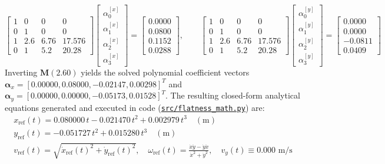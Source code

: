 \documentclass[10pt,a4paper]{article}
\begin{document}
\begin{equation}
    \begin{bmatrix}
        1 & 0 & 0 & 0 \\
        0 & 1 & 0 & 0 \\
        1 & 2.6 & 6.76 & 17.576 \\
        0 & 1 & 5.2 & 20.28
    \end{bmatrix}
    \begin{bmatrix}
        \alpha_0^{[x]} \\ \alpha_1^{[x]} \\ \alpha_2^{[x]} \\ \alpha_3^{[x]}
    \end{bmatrix}
    =
    \begin{bmatrix}
        0.0000 \\ 0.0800 \\ 0.1152 \\ 0.0288
    \end{bmatrix}, \qquad
    \begin{bmatrix}
        1 & 0 & 0 & 0 \\
        0 & 1 & 0 & 0 \\
        1 & 2.6 & 6.76 & 17.576 \\
        0 & 1 & 5.2 & 20.28
    \end{bmatrix}
    \begin{bmatrix}
        \alpha_0^{[y]} \\ \alpha_1^{[y]} \\ \alpha_2^{[y]} \\ \alpha_3^{[y]}
    \end{bmatrix}
    =
    \begin{bmatrix}
        0.0000 \\ 0.0000 \\ -0.0811 \\ 0.0409
    \end{bmatrix}
\end{equation}
Inverting $\mathbf{M}(2.60)$ yields the solved polynomial coefficient vectors $\boldsymbol{\alpha}_x = [0.00000, 0.08000, -0.02147, 0.00298]^T$ and $\boldsymbol{\alpha}_y = [0.00000, 0.00000, -0.05173, 0.01528]^T$. The resulting closed-form analytical equations generated and executed in code (\href{https://github.com/idiot28/sce672-assessment2/blob/main/src/flatness_math.py}{\texttt{src/flatness\_math.py}}) are:
\begin{align}
    \boxed{x_{\text{ref}}(t) = 0.080000\,t - 0.021470\,t^2 + 0.002979\,t^3 \quad (\text{m})} \label{eq:poly_x} \\
    \boxed{y_{\text{ref}}(t) = -0.051727\,t^2 + 0.015280\,t^3 \quad (\text{m})} \label{eq:poly_y} \\
    \boxed{v_{\text{ref}}(t) = \sqrt{\dot{x}_{\text{ref}}(t)^2 + \dot{y}_{\text{ref}}(t)^2}, \quad \omega_{\text{ref}}(t) = \frac{\dot{x}\ddot{y} - \dot{y}\ddot{x}}{\dot{x}^2 + \dot{y}^2}, \quad v_y(t) \equiv 0.000\text{~m/s}} \label{eq:poly_v}
\end{align}
\end{document}
